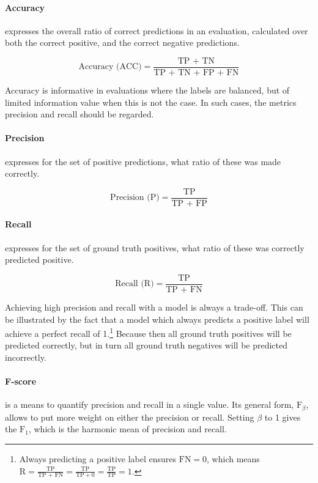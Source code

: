 \paragraph{Accuracy} expresses the overall ratio of correct predictions in an evaluation, calculated over both the correct positive, and the correct negative predictions.

\begin{equation*}
\text{Accuracy (ACC)} = \frac{\text{TP + TN}}{\text{TP + TN + FP + FN}}
\end{equation*}

Accuracy is informative in evaluations where the labels are balanced, but of limited information value when this is not the case. In such cases, the metrics precision and recall should be regarded.

\paragraph{Precision} expresses for the set of positive predictions, what ratio of these was made correctly.

\begin{equation*}
\text{Precision (P)} = \frac{\text{TP}}{\text{TP + FP}}
\end{equation*}

\paragraph{Recall} expresses for the set of ground truth positives, what ratio of these was correctly predicted positive.

\begin{equation*}
\text{Recall (R)} = \frac{\text{TP}}{\text{TP + FN}}
\end{equation*}

Achieving high precision and recall with a model is always a trade-off. This can be illustrated by the fact that a model which always predicts a positive label will achieve a perfect recall of 1.\footnote{Always predicting a positive label ensures $\text{FN} = 0$, which means $\text{R} = \frac{\text{TP}}{\text{TP + FN}} = \frac{\text{TP}}{\text{TP} + 0} = \frac{\text{TP}}{\text{TP}} = 1$.} Because then all ground truth positives will be predicted correctly, but in turn all ground truth negatives will be predicted incorrectly.

\paragraph{F-score}
is a means to quantify precision and recall in a single value. Its general form, $\text{F}_\beta$, allows to put more weight on either the precision or recall. Setting $\beta$ to 1 gives the $\text{F}_1$, which is the harmonic mean of precision and recall.

